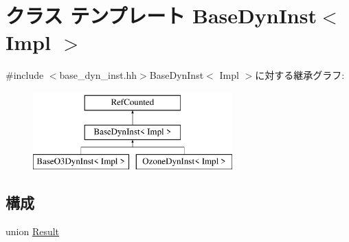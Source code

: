 \hypertarget{classBaseDynInst}{
\section{クラス テンプレート BaseDynInst$<$ Impl $>$}
\label{classBaseDynInst}
}


{\ttfamily \#include $<$base\_\-dyn\_\-inst.hh$>$}BaseDynInst$<$ Impl $>$に対する継承グラフ:\begin{figure}[H]
\begin{center}
\leavevmode
\includegraphics[height=3cm]{classBaseDynInst}
\end{center}
\end{figure}
\subsection*{構成}
\begin{DoxyCompactItemize}
\item 
union \hyperlink{unionBaseDynInst_1_1Result}{Result}
\end{DoxyCompactItemize}
